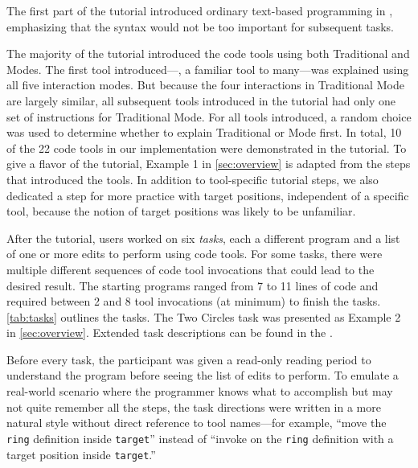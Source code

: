 


The first part of the tutorial introduced ordinary text-based programming in
\little{}, emphasizing that the syntax would not be too important for subsequent
tasks.

The majority of the tutorial introduced the code tools using both
Traditional and \deuce{} Modes.
%
The first tool introduced---, a familiar tool to
many---was explained using all five interaction modes. But because the four interactions
in Traditional Mode are largely similar, all subsequent tools introduced
in the tutorial had only one set of instructions for Traditional Mode. For all
tools introduced, a random choice was used to determine whether to explain
Traditional or \deuce{} Mode first. In total, 10 of the 22 code tools in
our implementation were demonstrated in the tutorial.
To give a flavor of the tutorial, Example 1 in \autoref{sec:overview}
is adapted from the steps that introduced the  tools.
%
In addition to tool-specific tutorial steps,
we also dedicated a step for more practice with target positions, independent
of a specific tool, because the notion of target positions was likely to be
unfamiliar. %



After the tutorial, users worked on six \emph{tasks}, each a
different program and a list of one or more edits to perform using code tools.
%
For some tasks, there were multiple different sequences of code tool invocations
that could lead to the desired result.
%
The starting programs ranged from 7 to 11 lines of code and required between
2 and 8 tool invocations (at minimum) to finish the tasks.
%
\autoref{tab:tasks} outlines the tasks. The Two Circles task was
presented as Example 2 in \autoref{sec:overview}. Extended task
descriptions
can be found in
the \suppMaterials{}.

Before every task, the participant was given a read-only reading period to understand the program
before seeing the list of edits to perform.
%
To emulate a real-world scenario where the programmer knows what to accomplish
but may not quite remember all the steps, the task directions were written in a
more natural style without direct reference to tool names---for example, ``move
the \verb+ring+ definition inside \verb+target+'' instead of ``invoke
 on the \verb+ring+ definition with a target position
inside \verb+target+.''

